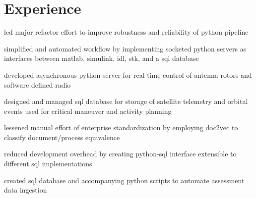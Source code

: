 %
\begin{minipage}[t]{0.66\textwidth} %


\section{Experience}

\vspace{\topsep}
\begin{tightitemize}
    \item led major refactor effort to improve robustness and reliability of python pipeline
    \item simplified and automated workflow by implementing socketed python servers as interfaces between matlab, simulink, idl, stk, and a sql database
    \item developed asynchronous python server for real time control of antenna rotors and software defined radio
    \item designed and managed sql database for storage of satellite telemetry and orbital events used for critical maneuver and activity planning
\end{tightitemize}


\begin{tightitemize}
    \item lessened manual effort of enterprise standardization by employing doc2vec to classify document/process equivalence
    \item reduced development overhead by creating python-sql interface extensible to different sql implementations
    \item created sql database and accompanying python scripts to automate assessment data ingestion
\end{tightitemize}



\end{minipage}

